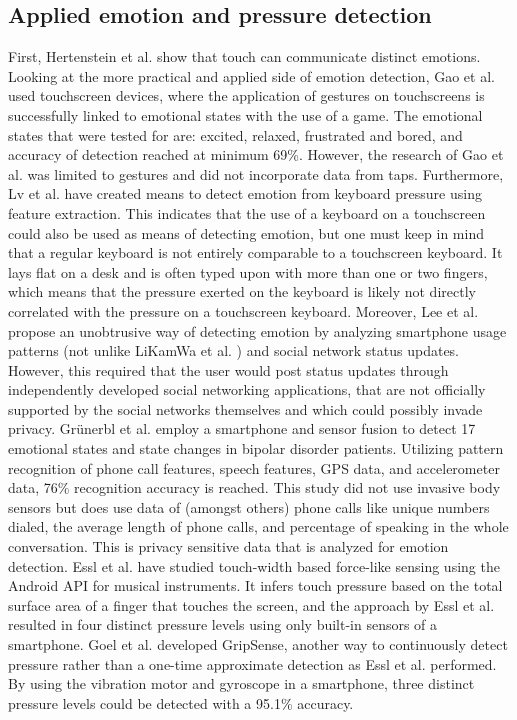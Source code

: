 \documentclass{sigchi}
\begin{document}
\subsection{Applied emotion and pressure detection} %
\label{sub:practical_applications}
First, Hertenstein et al. \cite{Hertenstein2006} show that touch can communicate distinct emotions. Looking at the more practical and applied side of emotion detection, Gao et al. \cite{Gao2012} used touchscreen devices, where the application of gestures on touchscreens is successfully linked to emotional states with the use of a game. The emotional states that were tested for are: excited, relaxed, frustrated and bored, and accuracy of detection reached at minimum 69\%. However, the research of Gao et al. was limited to gestures and did not incorporate data from taps. Furthermore, Lv et al. \cite{H.R.LvZ.L.LinW.J.Yin2008} have created means to detect emotion from keyboard pressure using feature extraction. This indicates that the use of a keyboard on a touchscreen could also be used as means of detecting emotion, but one must keep in mind that a regular keyboard is not entirely comparable to a touchscreen keyboard. It lays flat on a desk and is often typed upon with more than one or two fingers, which means that the pressure exerted on the keyboard is likely not directly correlated with the pressure on a touchscreen keyboard. Moreover, Lee et al. \cite{Lee2012} propose an unobtrusive way of detecting emotion by analyzing smartphone usage patterns (not unlike LiKamWa et al. \cite{Likamwa2013}) and social network status updates. However, this required that the user would post status updates through independently developed social networking applications, that are not officially supported by the social networks themselves and which could possibly invade privacy. Gr{\"{u}}nerbl et al. \cite{Grunerbl2015} employ a smartphone and sensor fusion to detect 17 emotional states and state changes in bipolar disorder patients. Utilizing pattern recognition of phone call features, speech features, GPS data, and accelerometer data, 76\% recognition accuracy is reached. This study did not use invasive body sensors but does use data of (amongst others) phone calls like unique numbers dialed, the average length of phone calls, and percentage of speaking in the whole conversation. This is privacy sensitive data that is analyzed for emotion detection. Essl et al. \cite{Essl2010} have studied touch-width based force-like sensing using the Android API for musical instruments. It infers touch pressure based on the total surface area of a finger that touches the screen, and the approach by Essl et al. resulted in four distinct pressure levels using only built-in sensors of a smartphone. Goel et al. \cite{Goel2012} developed GripSense, another way to continuously detect pressure rather than a one-time approximate detection as Essl et al. performed. By using the vibration motor and gyroscope in a smartphone, three distinct pressure levels could be detected with a 95.1\% accuracy.
\end{document}

